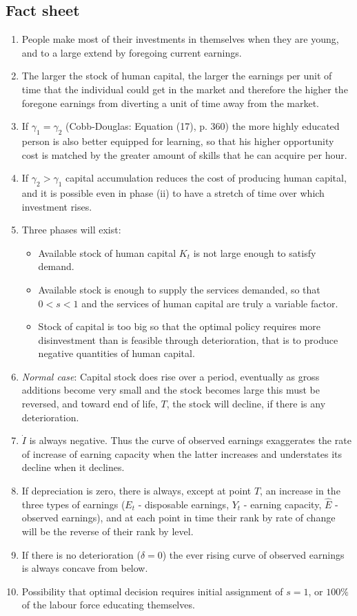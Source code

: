 \documentclass[12pt,a4paper]{article}
\begin{document}
  \subsection{Fact sheet} %
  \begin{enumerate}
    \item People make most of their investments in themselves when they are young, and to a large extend by foregoing current earnings.
	\item The larger the stock of human capital, the larger the earnings per unit of time that the individual could get in the market and therefore the higher the foregone earnings from diverting a unit of time away from the market.
	\item If $\gamma _{1} = \gamma _{2}$ (Cobb-Douglas: Equation (17), p. 360) the more highly educated person is also better equipped for learning, so that his higher opportunity cost is matched by the greater amount of skills that he can acquire per hour.
	\item If $\gamma _{2} > \gamma _{1}$ capital accumulation reduces the cost of producing human capital, and it is possible even in phase (ii) to have a stretch of time over which investment rises.
	\item Three phases will exist:
	  \begin{itemize}
	    \item Available stock of human capital $K_t$ is not large enough to satisfy demand.
	    \item Available stock is enough to supply the services demanded, so that $0<s<1$ and the services of human capital are truly a variable factor.
	    \item Stock of capital is too big so that the optimal policy requires more disinvestment than is feasible through deterioration, that is to produce negative quantities of human capital.
	  \end{itemize}
	\item \emph{Normal case}: Capital stock does rise over a period, eventually as gross additions become very small and the stock becomes large this must be reversed, and toward end of life, $T$, the stock will decline, if there is any deterioration.
	\item $\dot{I}$ is always negative. Thus the curve of observed earnings exaggerates the rate of increase of earning capacity when the latter increases and understates its decline when it declines.
	\item If depreciation is zero, there is always, except at point $T$, an increase in the three types of earnings ($E_t$ - disposable earnings, $Y_t$ - earning capacity, $\hat{E}$ - observed earnings), and at each point in time their rank by rate of change will be the reverse of their rank by level.
	\item If there is no deterioration ($\delta = 0$) the ever rising curve of observed earnings is always concave from below.
	\item Possibility that optimal decision requires initial assignment of $s=1$, or $100\%$ of the labour force educating themselves.
  \end{enumerate}
\end{document}

